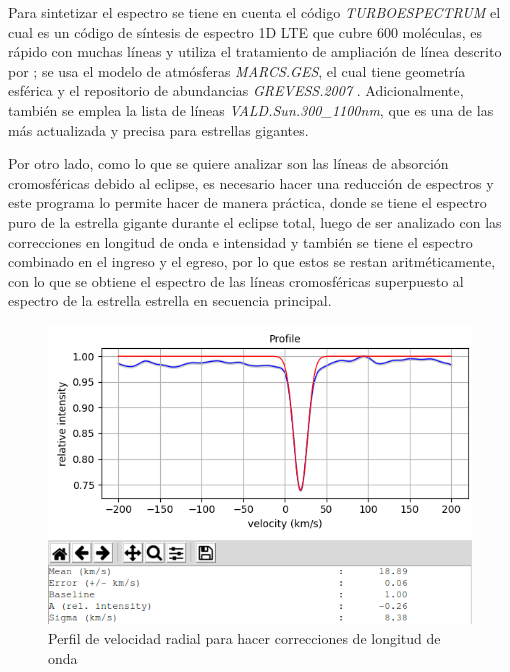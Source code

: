 \documentclass[12pt,oneside,openany,letter]{book}
\begin{document}
\noindent  Para sintetizar el espectro se tiene en cuenta el código \textit{TURBOESPECTRUM} el cual es un código de síntesis de espectro 1D LTE que cubre 600 moléculas, es rápido con muchas líneas y utiliza el tratamiento de ampliación de línea descrito por \citep{plez2012turbospectrum}; se usa el modelo de atmósferas \textit{MARCS.GES}, el cual tiene geometría esférica y el repositorio de abundancias \textit{GREVESS.2007} \citep{grevesse2007solar}. Adicionalmente, también se emplea la lista de líneas \textit{VALD.Sun.300\_1100nm}, que es una de las más actualizada y precisa para estrellas gigantes.





\noindent Por otro lado, como lo que se quiere analizar son las líneas de absorción cromosféricas debido al eclipse, es necesario hacer una reducción de espectros y este programa lo permite hacer de manera práctica, donde se tiene el espectro puro de la estrella gigante durante el eclipse total, luego de ser analizado con las correcciones en longitud de onda e intensidad y también se tiene el espectro combinado en el ingreso y el egreso, por lo que estos se restan aritméticamente, con lo que se obtiene el espectro de las líneas cromosféricas superpuesto al espectro de la estrella estrella en secuencia principal.



\begin{figure}[h]
    \centering
    \includegraphics[width=0.8\linewidth]{Images/correct_vel_rad.PNG}
    \caption{Perfil de velocidad radial para hacer correcciones de longitud de onda}
    \label{fig:vel_radial}
\end{figure}
\end{document}
